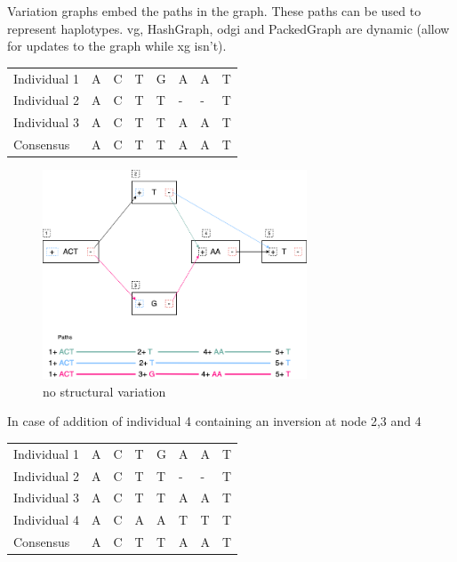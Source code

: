 \documentclass[11pt]{article}
\begin{document}
\newpage
Variation graphs embed the paths in the graph. 
These paths can be used to represent haplotypes. vg, HashGraph,
odgi and PackedGraph are dynamic (allow for updates to the graph while xg isn’t).

\begin{center}
\begin{tabular}{llllllll}
Individual 1 & A & C & T & G & A & A & T\\
Individual 2 & A & C & T & T & - & - & T\\
Individual 3 & A & C & T & T & A & A & T\\
\hline
Consensus & A & C & T & T & A & A & T\\
\end{tabular}
\end{center}


\begin{figure}[H]
\centering
\includegraphics[width=0.7\textwidth]{assets/images/Variation Graph-Page-1.png}
\caption{no structural variation}\label{no struct}
\end{figure}

\newpage
In case of addition of individual 4 containing an inversion at node 2,3 and 4

\begin{center}
\begin{tabular}{llllllll}
Individual 1 & A & C & T & G & A & A & T\\
Individual 2 & A & C & T & T & - & - & T\\
Individual 3 & A & C & T & T & A & A & T\\
Individual 4 & A & C & A & A & T & T & T\\
\hline
Consensus & A & C & T & T & A & A & T\\
\end{tabular}
\end{center}
\end{document}
